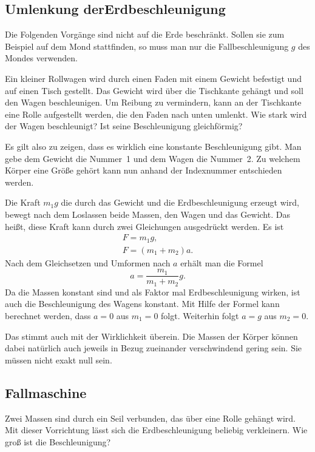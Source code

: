\documentclass[a4paper,11pt,fleqn,twocolumn,twoside,dvipdfmx]{scrartcl}
\begin{document}
\subsection[Umlenkung der Erdbeschleunigung]
{Umlenkung der\newline Erdbeschleunigung}

Die Folgenden Vorgänge sind nicht auf die Erde beschränkt. Sollen
sie zum Beispiel auf dem Mond stattfinden, so muss man nur die
Fallbeschleunigung $g$ des Mondes verwenden.

Ein kleiner Rollwagen wird durch einen Faden mit einem Gewicht
befestigt und auf einen Tisch gestellt. Das Gewicht wird über die
Tischkante gehängt und soll den Wagen beschleunigen. Um Reibung zu
vermindern, kann an der Tischkante eine Rolle aufgestellt werden, die
den Faden nach unten umlenkt. Wie stark wird der Wagen beschleunigt?
Ist seine Beschleunigung gleichförmig?

Es gilt also zu zeigen, dass es wirklich eine konstante Beschleunigung
gibt. Man gebe dem Gewicht die Nummer~1 und dem Wagen die Nummer~2.
Zu welchem Körper eine Größe gehört kann nun anhand der Indexnummer
entschieden werden.

Die Kraft ${m_1}g$ die durch das Gewicht und die Erdbeschleunigung
erzeugt wird, bewegt nach dem Loslassen beide Massen, den Wagen und das
Gewicht. Das heißt, diese Kraft kann durch zwei Gleichungen ausgedrückt
werden. Es ist%
\begin{gather*}
F = {m_1}g,\\
F = (m_1+m_2)a.
\end{gather*}
Nach dem Gleichsetzen und Umformen nach $a$ erhält man die Formel%
\[a = \frac{m_1}{m_1+m_2} g.\]
Da die Massen konstant sind und als Faktor mal Erdbeschleunigung
wirken, ist auch die Beschleunigung des Wagens konstant. Mit Hilfe
der Formel kann berechnet werden, dass $a=0$ aus $m_1=0$ folgt.
Weiterhin folgt $a=g$ aus $m_2=0$.

Das stimmt auch mit der Wirklichkeit überein. Die Massen der Körper
können dabei natürlich auch jeweils in Bezug zueinander verschwindend
gering sein. Sie müssen nicht exakt null sein.

\subsection{Fallmaschine}

Zwei Massen sind durch ein Seil verbunden, das über eine Rolle gehängt
wird. Mit dieser Vorrichtung lässt sich die Erdbeschleunigung beliebig
verkleinern. Wie groß ist die Beschleunigung?
\end{document}
